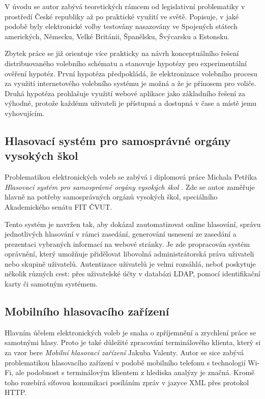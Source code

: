 \documentclass[11pt,twoside,a4paper]{book}
\begin{document}
V úvodu se autor zabývá teoretických rámcem od legislativní problematiky v prostředí České republiky až po praktické využití ve světě. Popisuje, v jaké podobě byly elektronické volby testovány nasazovány ve Spojených státech amerických, Německu, Velké Británii, Španělsku, Švýcarsku a Estonsku.

Zbytek práce se již orientuje více prakticky na návrh konceptuálního řešení distribuovaného volebního schématu a stanovuje hypotézy pro experimentální ověření hypotéz. První hypotéza předpokládá, že elektronizace volebního procesu za využití internetového volebního systému je možná a že je přínosem pro voliče. Druhá hypotéza prohlašuje využití webové aplikace jako základního řešení za výhodné, protože každému uživateli je přístupná a dostupná v čase a místě jemu vyhovujícím.

\subsection{Hlasovací systém pro samosprávné orgány vysokých škol}
Problematikou elektronických voleb se zabývá i diplomová práce Michala Petříka \textit{Hlasovací systém pro samosprávné orgány vysokých škol} \cite{art:petrik}. Zde se autor zaměřuje hlavně na potřeby samosprávných orgánů vysokých škol, speciálního Akademického senátu FIT ČVUT. 

Tento systém je navržen tak, aby dokázal zautomatizovat online hlasování, správu jednotlivých hlasování v rámci zasedání, generování usnesení ze zasedání a prezentaci vybraných informací na webové stránky. Je zde propracován systém oprávnění, který umožňuje přidělovat libovolná administrátorská práva uživateli nebo skupině uživatelů. Autentizace uživatelů je velmi rozsáhlá, neboť poskytuje několik různých cest: přes uživatelské účty v databázi LDAP, pomocí identifikační karty či samotným systémem. 

\subsection{Mobilního hlasovacího zařízení}

Hlavním účelem elektronických voleb je snaha o zpříjemnění a zrychlení práce se samotnými hlasy. Proto je také důležité zpracování terminálového klienta, který si za vzor bere \textit{Mobilní hlasovací zařízení} \cite{art:valenta} Jakuba Valenty. Autor se sice zabývá problematikou hlasovacího zařízení v podobě mobilního telefonu s technologií Wi-Fi, ale podobnost s terminálovým klientem z hlediska analýzy je značná. Kromě toho rozebírá síťovou komunikaci posíláním zpráv v jazyce XML přes protokol HTTP.
\end{document}
